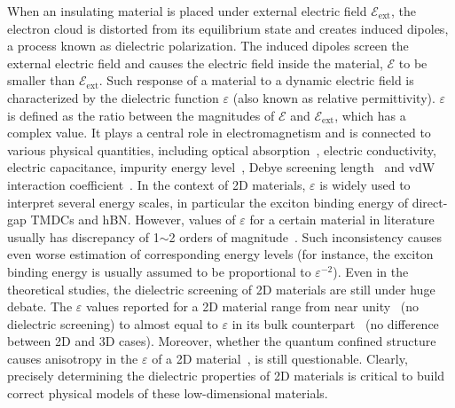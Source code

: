 When an insulating material is placed under external electric field
$\mathscr{E}_{\mathrm{ext}}$, the electron cloud is distorted from its
equilibrium state and creates induced dipoles, a process known as
dielectric polarization. The induced dipoles screen the external
electric field and causes the electric field inside the material,
$\mathscr{E}$ to be smaller than $\mathscr{E}_{\mathrm{ext}}$.
%
Such response of a material to a dynamic electric field is
characterized by the dielectric function $\varepsilon$ (also known as
relative permittivity).
%
$\varepsilon$ is defined as the ratio between the magnitudes of
$\mathscr{E}$ and $\mathscr{E}_{\mathrm{ext}}$, which has a complex
value.
%
It plays a central role in electromagnetism and is connected to
various physical quantities, including optical
absorption~\autocite{Dressel_2001_electrodynamics}, electric conductivity,
electric capacitance, impurity energy level~\autocite{Ihn_2009_book},
Debye screening length~\autocite{Israelachvili_2011_book} and vdW
interaction coefficient~\parencite{parsegian_van_2010_book}.
%
In the context of 2D materials, $\varepsilon$ is widely used to
interpret several energy scales, in particular the exciton binding
energy of direct-gap TMDCs and hBN.
%
However, values of $\varepsilon$ for a certain material in literature
usually has discrepancy of 1$\sim{}$2 orders of
magnitude~\autocite{Li_2016_screening_rev}.
%
Such inconsistency causes even worse estimation of corresponding
energy levels (for instance, the exciton binding energy is usually
assumed to be proportional to $\varepsilon^{-2}$).
%
Even in the theoretical studies, the dielectric screening of 2D
materials are still under huge debate.  The $\varepsilon$ values
reported for a 2D material range from near
unity~\autocite{Olsen_2016_hydrogen} (\ie no dielectric screening) to
almost equal to $\varepsilon$ in its bulk
counterpart~\autocite{Laturia_2018_2D_eps} (\ie no difference between 2D and 3D
cases).
%
Moreover, whether the quantum confined structure causes anisotropy in
the $\varepsilon$ of a 2D material~\autocite{Sohier_2016_2D_eps}, is still
questionable.
%
Clearly, precisely determining the dielectric properties of 2D
materials is critical to build correct physical models of these
low-dimensional materials.

